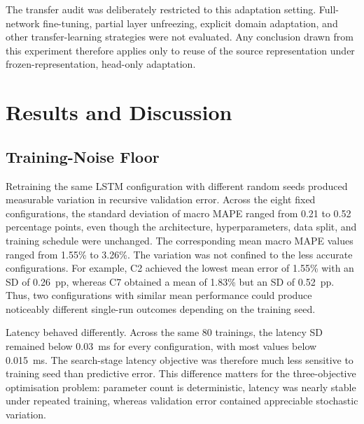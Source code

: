 \documentclass[a4paper,fleqn]{cas-sc}
\begin{document}
The transfer audit was deliberately restricted to this adaptation setting. Full-network fine-tuning, partial layer unfreezing, explicit domain adaptation, and other transfer-learning strategies were not evaluated. Any conclusion drawn from this experiment therefore applies only to reuse of the source representation under frozen-representation, head-only adaptation.


\section{Results and Discussion}
\label{sec:results_discussion}


\subsection{Training-Noise Floor}
\label{sec:noise_results}

Retraining the same LSTM configuration with different random seeds produced measurable variation in recursive validation error. Across the eight fixed configurations, the standard deviation of macro MAPE ranged from 0.21 to 0.52 percentage points, even though the architecture, hyperparameters, data split, and training schedule were unchanged. The corresponding mean macro MAPE values ranged from 1.55\% to 3.26\%.
The variation was not confined to the less accurate configurations. For example, C2 achieved the lowest mean error of 1.55\% with an SD of 0.26~pp, whereas C7 obtained a mean of 1.83\% but an SD of 0.52~pp. Thus, two configurations with similar mean performance could produce noticeably different single-run outcomes depending on the training seed.

Latency behaved differently. Across the same 80 trainings, the latency SD remained below 0.03~ms for every configuration, with most values below 0.015~ms. The search-stage latency objective was therefore much less sensitive to training seed than predictive error. This difference matters for the three-objective optimisation problem: parameter count is deterministic, latency was nearly stable under repeated training, whereas validation error contained appreciable stochastic variation.
\end{document}
